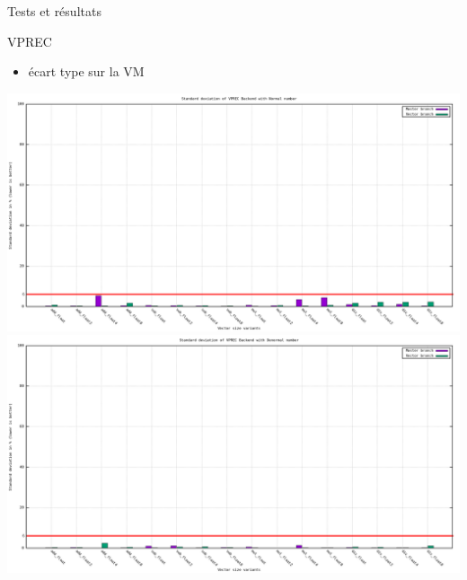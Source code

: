 \documentclass{beamer}
\begin{document}
\begin{frame}{Tests et résultats}

  \begin{block}{VPREC}
    \begin{itemize}
    \item écart type sur la VM 
    \end{itemize}
    \centering\includegraphics[scale=0.14]{../ressources/vm_vprec_normal_stddev.png}
    \centering\includegraphics[scale=0.125]{../ressources/vm_vprec_denormal_stddev.png}
  \end{block}

\end{frame}
\end{document}
